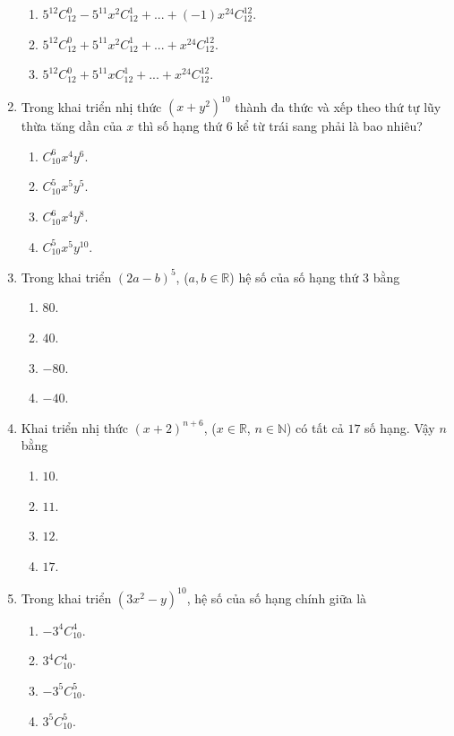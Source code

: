 \begin{enumerate}[label=\textbf{Câu \arabic*.},align=left,left=0cm..0cm,itemindent=*]
\begin{enumerate}[label=\textbf{\Alph*.},align=left,left=1cm..0cm,itemindent=*]
		\item $5^{12}C_{12}^0-5^{11}x^2C_{12}^1+...+ \left(-1\right) x^{24}C_{12}^{12}$.
		\item $5^{12}C_{12}^0+5^{11}x^2C_{12}^1+...+x^{24}C_{12}^{12}$.
		\item $5^{12}C_{12}^0+5^{11}xC_{12}^1+...+x^{24}C_{12}^{12}$.
	\end{enumerate}
	\item Trong khai triển nhị thức $\left(x+y^2\right)^{10}$ thành đa thức và xếp theo thứ tự lũy thừa tăng dần của $x$ thì số hạng thứ 6 kể từ trái sang phải là bao nhiêu?
	\begin{enumerate}[label=\textbf{\Alph*.},align=left,left=1cm..0cm,itemindent=*]
		\item $C_{10}^6x^4y^6$. \item $C_{10}^5x^5y^5$. \item $C_{10}^6x^4y^8$. \item $C_{10}^5x^5y^{10}$.
	\end{enumerate}
	\item Trong khai triển $(2a-b)^5$, ($a,b\in\mathbb{R}$) hệ số của số hạng thứ 3 bằng
	\begin{enumerate}[label=\textbf{\Alph*.},align=left,left=1cm..0cm,itemindent=*]
		\item $80$. \item $40$. \item $-80$. \item $-40$.
	\end{enumerate}
	\item Khai triển nhị thức $(x+2)^{n+6}$, ($x\in\mathbb{R}$, $n\in\mathbb{N}$) có tất cả $17$ số hạng. Vậy $n$ bằng
	\begin{enumerate}[label=\textbf{\Alph*.},align=left,left=1cm..0cm,itemindent=*]
		\item $10$. \item $11$. \item $12$. \item $17$.
	\end{enumerate}
	\item Trong khai triển $\left(3x^2-y\right)^{10}$, hệ số của số hạng chính giữa là
	\begin{enumerate}[label=\textbf{\Alph*.},align=left,left=1cm..0cm,itemindent=*]
		\item $-3^4C_{10}^4$. \item $3^4C_{10}^4$. \item $-3^5C_{10}^5$. \item $3^5C_{10}^5$.
	\end{enumerate}

\end{enumerate}
